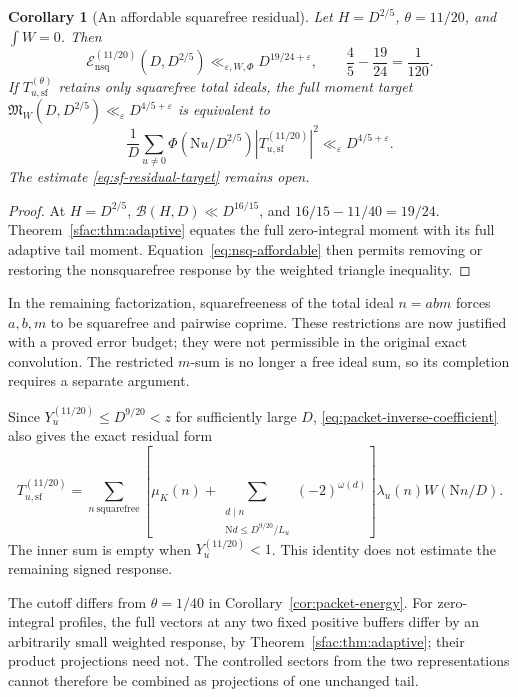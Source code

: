 \documentclass[11pt]{article}
\numberwithin{equation}{section}
\newtheorem{corollary}[theorem]{Corollary}
\theoremstyle{definition}
\theoremstyle{remark}
\newcommand{\N}{\mathrm N}
\newcommand{\muK}{\mu_K}
\newcommand{\eps}{\varepsilon}
\begin{document}
\begin{corollary}[An affordable squarefree residual]\label{cor:sf-residual}
Let \(H=D^{2/5}\), \(\theta=11/20\), and \(\int W=0\). Then
\begin{equation}\label{eq:nsq-affordable}
 \mathcal E_{\mathrm{nsq}}^{(11/20)}(D,D^{2/5})
       \ll_{\eps,W,\Phi}D^{19/24+\eps},
 \qquad \frac45-\frac{19}{24}=\frac1{120}.
\end{equation}
If \(T_{u,\mathrm{sf}}^{(\theta)}\) retains only squarefree total
ideals, the full moment target
\(\mathfrak M_W(D,D^{2/5})\ll_\eps D^{4/5+\eps}\)
is equivalent to
\begin{equation}\label{eq:sf-residual-target}
 \frac1D\sum_{u\ne0}\Phi(\N u/D^{2/5})
       |T_{u,\mathrm{sf}}^{(11/20)}|^2
                       \ll_\eps D^{4/5+\eps}.
\end{equation}
The estimate \eqref{eq:sf-residual-target} remains open.
\end{corollary}

\begin{proof}
At \(H=D^{2/5}\), \(\mathcal B(H,D)\ll D^{16/15}\), and
\(16/15-11/40=19/24\). Theorem~\ref{sfac:thm:adaptive} equates the
full zero-integral moment with its full adaptive tail moment.
Equation~\eqref{eq:nsq-affordable} then permits removing or restoring
the nonsquarefree response by the weighted triangle inequality.
\end{proof}

In the remaining factorization, squarefreeness of the total ideal
\(n=abm\) forces \(a,b,m\) to be squarefree and pairwise coprime.
These restrictions are now justified with a proved error budget;
they were not permissible in the original exact convolution.
The restricted \(m\)-sum is no longer a free ideal sum, so its
completion requires a separate argument.

Since \(Y_u^{(11/20)}\le D^{9/20}<z\) for sufficiently large \(D\),
\eqref{eq:packet-inverse-coefficient} also gives the exact residual form
\[
 T_{u,\mathrm{sf}}^{(11/20)}
 =\sum_{n\ \mathrm{squarefree}}
 \left[\muK(n)+
   \sum_{\substack{d\mid n\\\N d\le D^{9/20}/L_u}}
                    (-2)^{\omega(d)}\right]
              \lambda_u(n)W(\N n/D).
\]
The inner sum is empty when \(Y_u^{(11/20)}<1\). This identity
does not estimate the remaining signed response.

The cutoff differs from \(\theta=1/40\) in
Corollary~\ref{cor:packet-energy}. For zero-integral profiles, the
full vectors at any two fixed positive buffers differ by an
arbitrarily small weighted response, by
Theorem~\ref{sfac:thm:adaptive}; their product projections need not.
The controlled sectors from the two representations cannot therefore
be combined as projections of one unchanged tail.
\end{document}
